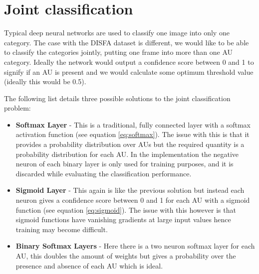     \newpage
  \section{Joint classification}

    Typical deep neural networks are used to classify
    one image into only one category. The case with the DISFA dataset is different, we
    would like to be able to classify the categories jointly,  putting one frame into more than
    one AU category. Ideally the network would output a confidence score between 0 and 1
    to signify if an AU is present and we would calculate some optimum threshold value
    (ideally this would be 0.5).

    The following list details three possible solutions to the joint classification problem:

    \begin{itemize} \label{sec:binsoft}
      \item {\bf Softmax Layer} - This is a traditional, fully connected layer with
                                  a softmax activation function (see equation \ref{eq:softmax}).
                                  The issue with this is that it provides a probability distribution over AUs
                                  but the required quantity is a probability distribution for each AU. In the implementation
                                  the negative neuron of each binary layer is only used for training purposes, and it is
                                  discarded while evaluating the classification performance.
      \item {\bf Sigmoid Layer} - This again is like the previous solution but instead each neuron gives a confidence
                                  score between 0 and 1 for each AU with a sigmoid function (see equation \ref{eq:sigmoid}).
                                  The issue with this however is that sigmoid
                                  functions have vanishing gradients at large input values
                                  hence training may become difficult.
      \item {\bf Binary Softmax Layers} - Here there is a two neuron softmax layer
                                          for each AU, this doubles the amount of weights
                                          but gives a probability over the presence and
                                          absence of each AU which is ideal.
    \end{itemize}

